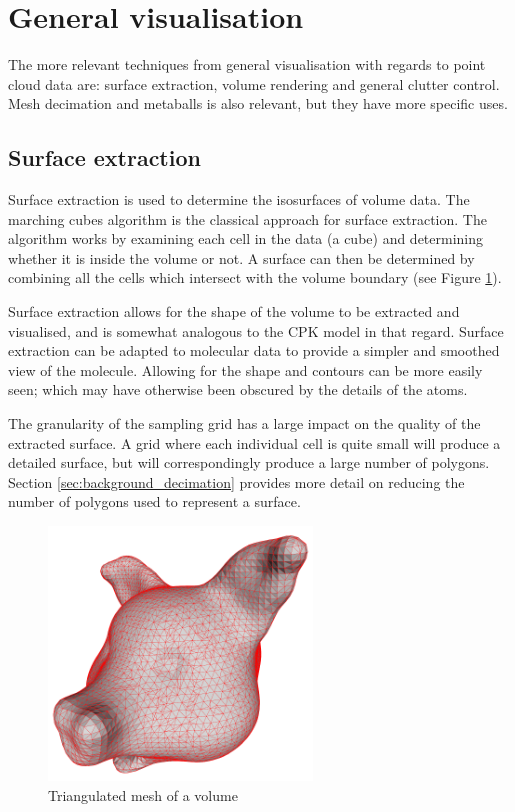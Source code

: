 

\section{General visualisation}
\label{sec:background_general}


The more relevant techniques from general visualisation with regards to point
cloud data are: surface extraction, volume rendering and general clutter
control. Mesh decimation and metaballs is also relevant, but they have more
specific uses.


\subsection{Surface extraction}
\label{sub:background_surface}

Surface extraction is used to determine the isosurfaces of volume data. The
marching cubes algorithm \citep{lorensen87} is the classical approach for
surface extraction. The algorithm works by examining each cell in the data (a
cube) and determining whether it is inside the volume or not. A surface can
then be determined by combining all the cells which intersect with the volume
boundary (see Figure \ref{fig:background_mesh}).

Surface extraction allows for the shape of the volume to be extracted and
visualised, and is somewhat analogous to the CPK model in that regard. Surface
extraction can be adapted to molecular data to provide a simpler and smoothed
view of the molecule. Allowing for the shape and contours can be more easily
seen; which may have otherwise been obscured by the details of the atoms.

The granularity of the sampling grid has a large impact on the quality of the
extracted surface. A grid where each individual cell is quite small will
produce a detailed surface, but will correspondingly produce a large number of
polygons. Section \ref{sec:background_decimation} provides more detail on
reducing the number of polygons used to represent a surface.

\begin{figure}[h!]
  \begin{center}
    \includegraphics[width=70mm]{triangulated_mesh}
  \end{center}
  \caption{Triangulated mesh of a volume}
  \label{fig:background_mesh}
\end{figure}

